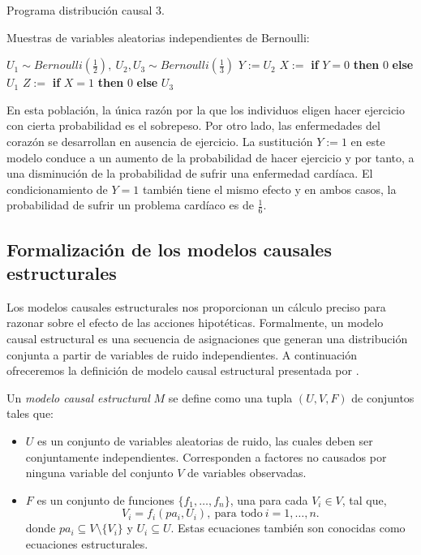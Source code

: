 \documentclass[oneside,openright,titlepage,numbers=noenddot,openany,headinclude,footinclude=true,
cleardoublepage=empty,abstractoff,BCOR=5mm,paper=a4,fontsize=12pt,main=spanish]{scrreprt}
\begin{document}
\begin{algorithm}[h]
\caption{Programa distribución causal 3.}
    Muestras de variables aleatorias independientes de Bernoulli:
     
    $U_1 \sim  Bernoulli\left(\frac{1}{2}\right), \ U_2,U_3 \sim  Bernoulli\left(\frac{1}{3}\right)$\;
    $Y:=U_2$\;
    $X:=$ \textbf{if} $Y=0$ \textbf{then} $0$ \textbf{else} $U_1$\;
    $Z:=$ \textbf{if} $X=1$ \textbf{then} $0$ \textbf{else} $U_3$\;
    \label{alg:programa3}
\end{algorithm}

En esta población, la única razón por la que los individuos eligen hacer ejercicio con cierta probabilidad es el sobrepeso. Por otro lado, las enfermedades del corazón se desarrollan en ausencia de ejercicio. La sustitución $Y := 1$ en este modelo conduce a un aumento de la probabilidad de hacer ejercicio y por tanto, a una disminución de la probabilidad de sufrir una enfermedad cardíaca. El condicionamiento de $Y = 1$ también tiene el mismo efecto y en ambos casos, la probabilidad de sufrir un problema cardíaco es de  $\frac{1}{6}$.

\subsection{Formalización de los modelos causales estructurales}

Los modelos causales estructurales nos proporcionan un cálculo preciso para razonar sobre el efecto de las acciones hipotéticas. Formalmente, un modelo causal estructural es una secuencia de asignaciones que generan una distribución conjunta a partir de variables de ruido independientes. A continuación ofreceremos la definición de modelo causal estructural presentada por \cite{causality2000}.\\

\begin{definition} \label{def:modcausalest}
Un \textit{modelo causal estructural} $M$ se define como una tupla $(U,V,F)$ de conjuntos tales que:
\begin{itemize}
    \item $U$ es un conjunto de variables aleatorias de ruido, las cuales deben ser conjuntamente independientes. Corresponden a factores no causados por ninguna variable del conjunto $V$ de variables observadas.
    \item $F$ es un conjunto de funciones $\{f_1,\dots,f_n\}$, una para cada $V_i\in V$, tal que, $$V_i=f_i(pa_i,U_i), \ \text{para todo} \ i=1,\dots,n.$$
    donde $pa_i \subseteq V \setminus \{V_i\}$ y $U_i \subseteq U$. Estas ecuaciones también son conocidas como ecuaciones estructurales.
\end{itemize}
\end{definition}\
\end{document}
